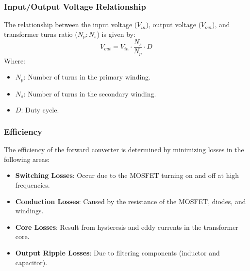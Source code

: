 \subsubsection*{Input/Output Voltage Relationship}
The relationship between the input voltage ($ V_{in} $), output voltage ($ V_{out} $), and transformer turns ratio ($ N_p : N_s $) is given by:
$$
V_{out} = V_{in} \cdot \frac{N_s}{N_p} \cdot D
$$
Where:
\begin{itemize}
    \item $ N_p $: Number of turns in the primary winding.
    \item $ N_s $: Number of turns in the secondary winding.
    \item $ D $: Duty cycle.
\end{itemize}

\subsubsection*{Efficiency}
The efficiency of the forward converter is determined by minimizing losses in the following areas:
\begin{itemize}
    \item \textbf{Switching Losses}: Occur due to the MOSFET turning on and off at high frequencies.
    \item \textbf{Conduction Losses}: Caused by the resistance of the MOSFET, diodes, and windings.
    \item \textbf{Core Losses}: Result from hysteresis and eddy currents in the transformer core.
    \item \textbf{Output Ripple Losses}: Due to filtering components (inductor and capacitor).
\end{itemize}